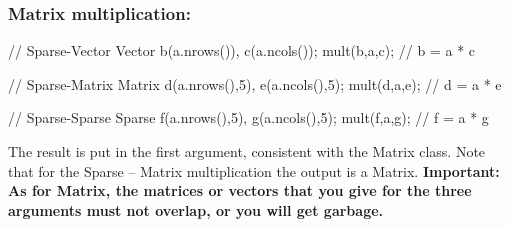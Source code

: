 \subsubsection{Matrix multiplication:}
\begin{code}
// Sparse-Vector
Vector b(a.nrows()), c(a.ncols());
mult(b,a,c);        // b = a * c

// Sparse-Matrix
Matrix d(a.nrows(),5), e(a.ncols(),5);
mult(d,a,e);        // d = a * e

// Sparse-Sparse
Sparse f(a.nrows(),5), g(a.ncols(),5);
mult(f,a,g);        // f = a * g
\end{code}
The result is put in the first argument, consistent with the Matrix class.
Note that for the Sparse -- Matrix multiplication the output is a Matrix.
\textbf{Important: As for Matrix, the matrices or vectors
that you give for the three arguments must not overlap, or you will get
garbage.}





